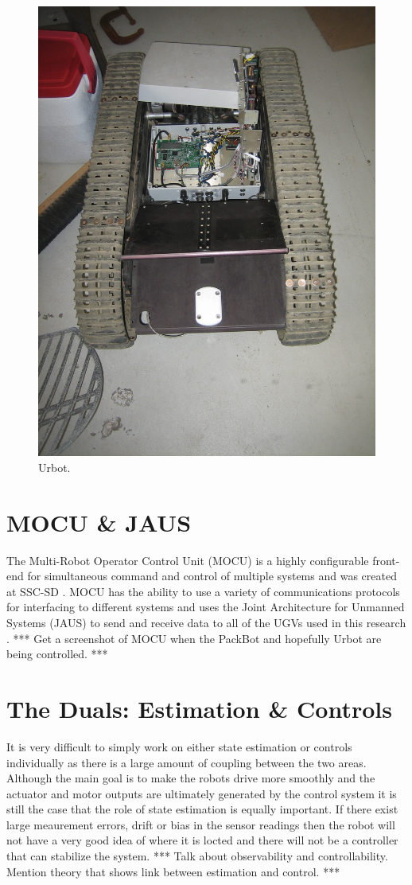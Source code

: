 \begin{figure}[ht!]
	\centering
	\includegraphics[width=.3\textwidth]{images/urbot}
	\caption{Urbot.}
	\label{fig:urbot}
\end{figure}

\section{MOCU \& JAUS}
\label{sec:mocujaus}
The Multi-Robot Operator Control Unit (MOCU) is a highly configurable front-end for simultaneous command and control of multiple systems and was created at SSC-SD \cite{PowellMOCU08}. MOCU has the ability to use a variety of communications protocols for interfacing to different systems and uses the Joint Architecture for Unmanned Systems (JAUS) to send and receive data to all of the UGVs used in this research \cite{RoweJAUS08}. *** Get a screenshot of MOCU when the PackBot and hopefully Urbot are being controlled. ***

\section{The Duals: Estimation \& Controls}
\label{sec:duals}
It is very difficult to simply work on either state estimation or controls individually as there is a large amount of coupling between the two areas. Although the main goal is to make the robots drive more smoothly and the actuator and motor outputs are ultimately generated by the control system it is still the case that the role of state estimation is equally important. If there exist large meaurement errors, drift or bias in the sensor readings then the robot will not have a very good idea of where it is locted and there will not be a controller that can stabilize the system. *** Talk about observability and controllability. Mention theory that shows link between estimation and control. ***

